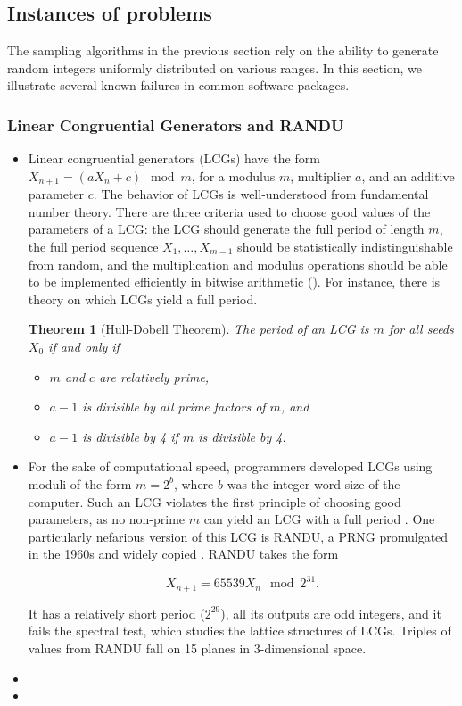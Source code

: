 \documentclass[12pt]{article}
\newtheorem{theorem}{Theorem}[section]
\newcommand{\todo}[1]{{\color{red}{TO DO: \sc #1}}}
\begin{document}
\subsection{Instances of problems}
The sampling algorithms in the previous section rely on the ability to generate random integers uniformly distributed 
on various ranges.
In this section, we illustrate several known failures in common software packages.
 

\subsubsection{Linear Congruential Generators and RANDU}

\begin{itemize}
\item Linear congruential generators (LCGs) have the form $X_{n+1} = (a X_n + c) \mod m$, for a modulus $m$, 
multiplier $a$, and an additive parameter $c$.
The behavior of LCGs is well-understood from fundamental number theory.
There are three criteria used to choose good values of the parameters of a LCG:
the LCG should generate the full period of length $m$,
the full period sequence $X_1, \dots, X_{m-1}$ should be statistically indistinguishable from random,
and the multiplication and modulus operations should be able to be implemented efficiently in bitwise arithmetic (\todo{cite Hornfeck and Harbrecht}).
For instance, there is theory on which LCGs yield a full period. \todo{cite theorem}

\begin{theorem}[Hull-Dobell Theorem]
The period of an LCG is $m$ for all seeds $X_0$ if and only if
\begin{itemize}
\item $m$ and $c$ are relatively prime,
\item $a-1$ is divisible by all prime factors of $m$, and
\item $a-1$ is divisible by 4 if $m$ is divisible by 4.
\end{itemize}
\end{theorem}

\item For the sake of computational speed, programmers developed LCGs using moduli of the form $m = 2^b$, where
$b$ was the integer word size of the computer.
Such an LCG violates the first principle of choosing good parameters, as no non-prime $m$ can yield an LCG with a full period \todo{cite or prove}.
One particularly nefarious version of this LCG is RANDU, a PRNG promulgated in the 1960s and widely copied \todo{cite}. 
RANDU takes the form

$$X_{n+1} = 65539 X_n \mod 2^{31}.$$

It has a relatively short period ($2^{29}$), all its outputs are odd integers, and it fails the spectral test, which studies the lattice structures of LCGs.
Triples of values from RANDU fall on 15 planes in 3-dimensional space.
\item \todo{mention RANDU blowing up science, finding erroneous crystallographic structure}
\item \todo{mention Marsaglia random numbers fall on the planes}
\end{itemize}
\end{document}
